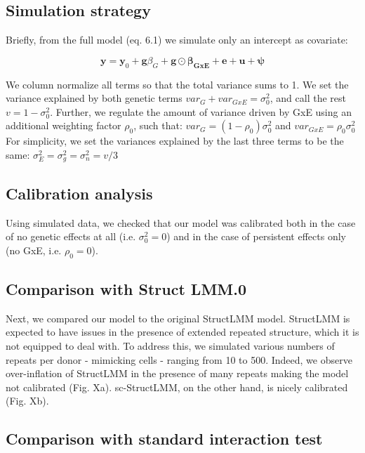 \subsection{Simulation strategy}
Briefly, from the full model (eq. 6.1) we simulate only an intercept as covariate:  

\begin{equation}
 \mathbf{y} = \mathbf{y}_0 + \mathbf{g}\beta_G + \mathbf{g} \odot \boldsymbol{\beta_{GxE}} + \mathbf{e} + \mathbf{u} + \boldsymbol{\psi} 
\end{equation}

We column normalize all terms so that the total variance sums to 1.
We set the variance explained by both genetic terms $var_G+var_{GxE}=\sigma_0^2$, and call the rest $v = 1-\sigma_0^2$.
Further, we regulate the amount of variance driven by GxE using an additional weighting factor $\rho_0$, such that: $var_G = (1-\rho_0)\sigma_0^2$ and $var_{GxE} = \rho_0\sigma_0^2$
For simplicity, we set the variances explained by the last three terms to be the same:
$\sigma_E^2 = \sigma_g^2 = \sigma_n^2 = v/3$

\subsection{Calibration analysis}

Using simulated data, we checked that our model was calibrated both in the case of no genetic effects at all (i.e. $\sigma_0^2 = 0$) and in the case of persistent effects only (no GxE, i.e. $\rho_0 = 0$).

\subsection{Comparison with Struct LMM.0}

Next, we compared our model to the original StructLMM model.
StructLMM is expected to have issues in the presence of extended repeated structure, which it is not equipped to deal with.
To address this, we simulated various numbers of repeats per donor - mimicking cells -  ranging from 10 to 500.
Indeed, we observe over-inflation of StructLMM in the presence of many repeats making the model not calibrated (Fig. Xa).
sc-StructLMM, on the other hand, is nicely calibrated (Fig. Xb).

\subsection{Comparison with standard interaction test}

